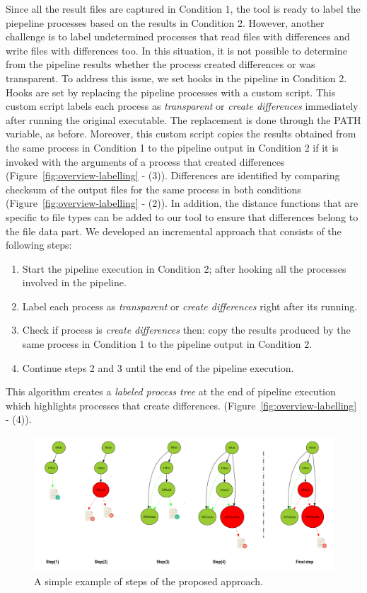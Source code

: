 \documentclass[a4paper,num-refs]{oup-contemporary}
\begin{document}
Since all the result files are captured in Condition 1, the tool 
is ready to label the piepeline processes based on the results in Condition 2.
However, another challenge is to label undetermined processes that read files with 
differences and write files with differences too. In this
situation, it is not possible to determine from the pipeline results 
whether the process created differences or 
was transparent.
To address this issue, we set hooks in the pipeline 
in Condition 2. Hooks are set by replacing the pipeline 
processes with a custom script. This custom script labels each process 
as \emph{transparent} or \emph{create differences} immediately after running 
the original executable. 
The replacement is done through the PATH variable, as before. Moreover, 
this custom script copies the results obtained from the same process in 
Condition 1 to the pipeline output in Condition 2 if 
it is invoked with the arguments of a process that created differences 
(Figure~\ref{fig:overview-labelling} - (3)). 
Differences are identified by comparing checksum of the output files for 
the same process in both conditions (Figure~\ref{fig:overview-labelling} - (2)).
In addition, the distance functions that are specific to file types can be added 
to our tool to ensure that differences belong to the file data part.
We developed an incremental approach that consists of the following steps: 

\begin{enumerate}
  \item Start the pipeline execution in Condition 2; 
        after hooking all the processes involved in the pipeline.
  \item Label each process as \emph{transparent} or \emph{create differences} 
        right after its running.
  \item Check if process is \emph{create differences} then: 
        copy the results produced by the same process in Condition 1 to the 
        pipeline output in Condition 2. 
  \item Continue steps 2 and 3 until the end of the pipeline execution.
\end{enumerate}

This algorithm creates a \emph{labeled process tree} at the end of pipeline execution 
which highlights processes that create differences.
(Figure~\ref{fig:overview-labelling} - (4)).

\begin{figure}
  \centering
  \includegraphics[width=\columnwidth]{images/iterative_modif}
  \caption{A simple example of steps of the proposed approach.}
  \label{fig:iterations}
\end{figure}
\end{document}
